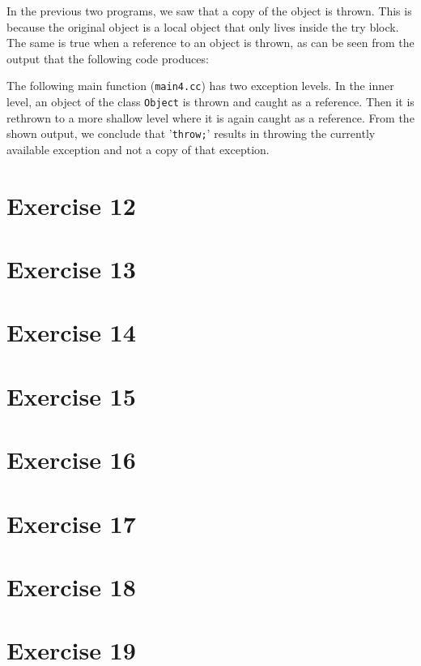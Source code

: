 \documentclass[12pt]{article}
\newcommand{\desc}[1]{\textit{#1} \vspace{1em}}
\begin{document}
\vspace{0.5cm}
In the previous two programs, we saw that a copy of the object is thrown. This is because the original object is a local object that only lives inside the try block. The same is true when a reference to an object is thrown, as can be seen from the output that the following code produces:



\vspace{0.5cm}
The following main function (\texttt{main4.cc}) has two exception levels. In the inner level, an object of the class \texttt{Object} is thrown and caught as a reference. Then it is rethrown to a more shallow level where it is again caught as a reference. From the shown output, we conclude that '\texttt{throw;}' results in throwing the currently available exception and not a copy of that exception.




\clearpage
\section*{Exercise 12}
\desc{}

\clearpage
\section*{Exercise 13}
\desc{}

\clearpage
\section*{Exercise 14}
\desc{}


\clearpage
\section*{Exercise 15}
\desc{}

\clearpage
\section*{Exercise 16}
\desc{}


\clearpage
\section*{Exercise 17}
\desc{}


\clearpage
\section*{Exercise 18}
\desc{}


\clearpage
\section*{Exercise 19}
\desc{}


\clearpage
\end{document}
